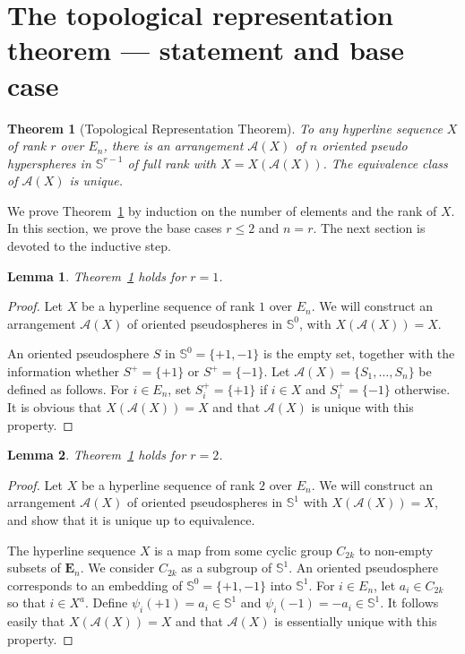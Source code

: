 \documentclass[a4paper]{amsart}
\newcommand{\p}{\mathbb S}
\newtheorem{theorem}{Theorem}
\newtheorem{lemma}{Lemma}
\theoremstyle{definition}
\theoremstyle{remark}
\begin{document}

\section{The topological representation theorem --- statement and base case}
\label{sec:FLbase}


\begin{theorem}[Topological Representation Theorem]\label{thm:FL}
  To any hyperline sequence $X$ of rank $r$ over $E_n$, there is
  an arrangement $\mathcal A(X)$ of  $n$ oriented pseudo 
  hyperspheres in $\mathbb S^{r-1}$ of full rank with $X=X(\mathcal A(X))$. The
  equivalence class of $\mathcal A(X)$ is unique. 
\end{theorem}

We prove Theorem~\ref{thm:FL} by induction on the number of elements and
the rank of $X$.  
In this section, we prove the base cases $r\le 2$ and $n=r$. The next
section is devoted to the inductive step.

\begin{lemma}\label{lem:FLbasecase_r=1}
  Theorem~\ref{thm:FL} holds for $r=1$.
\end{lemma}
\begin{proof}
  Let $X$ be a hyperline sequence of rank $1$ over $E_n$. We will
  construct an arrangement $\mathcal A(X)$ of oriented pseudospheres in
  $\p^0$, with $X(\mathcal A(X)) = X$. 

  An oriented pseudosphere $S$ in $\p^0= \{+1,-1\}$ is the empty set,
  together with the information whether $S^+=\{+1\}$ or $S^+=\{-1\}$. 
  Let $\mathcal A(X)= \{S_1,\dots, S_n\}$ be defined as follows.
  For $i\in E_n$, set $S_i^+= \{+1\}$ if $ i\in X$ and $S_i^+=
  \{-1\}$ otherwise. It is obvious that $X(\mathcal A(X)) = X$ and that 
  $\mathcal A(X)$ is unique with this property.
\end{proof}

\begin{lemma}\label{lem:FLbasecase_r=2}
  Theorem~\ref{thm:FL} holds for $r=2$.
\end{lemma}
\begin{proof}
  Let $X$ be a hyperline sequence of rank $2$ over $E_n$. 
  We will construct an arrangement $\mathcal A(X)$ of oriented
  pseudospheres in $\p^1$ with $X(\mathcal A(X)) = X$, and show that it
  is unique up to equivalence.

  The hyperline sequence  $X$ is a map from some cyclic group $C_{2k}$
  to non-empty subsets of $\mathbf E_n$. We consider $C_{2k}$ as a
  subgroup of $\p^1$.  
  An oriented pseudosphere corresponds to an embedding of
  $\p^0=\{+1,-1\}$ into $\p^1$. 
  For $i\in E_n$, let $a_i\in C_{2k}$ so that $ i\in X^a$. Define
  $\psi_i(+1) = a_i\in \p^1$ and $\psi_i(-1) = -a_i \in \p^1$. 
  It follows easily that $X(\mathcal A(X)) = X$ and that 
  $\mathcal A(X)$ is essentially unique with this property.
\end{proof}
\end{document}
